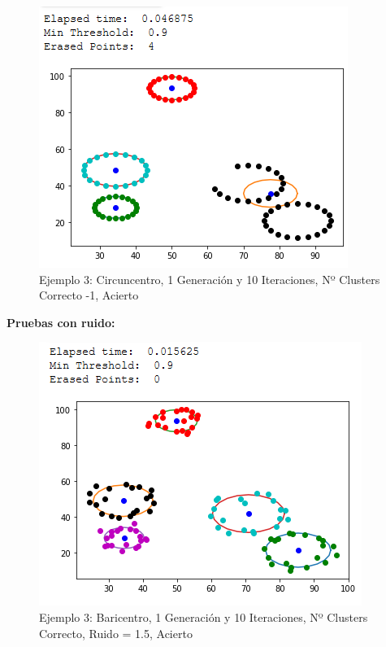 \documentclass[conference,a4paper]{IEEEtran}
\begin{document}
\begin{figure}[H]
\centering
\includegraphics[scale=0.65]{Experimentacion/Ejemplo3/ej3_c_1_10_lc}
\caption{Ejemplo 3: Circuncentro, 1 Generación y 10 Iteraciones,  Nº Clusters Correcto -1, Acierto\\}
\end{figure}

\clearpage
\textbf{Pruebas con ruido:}\\

\begin{figure}[H]
\centering
\includegraphics[scale=0.65]{Experimentacion/Ejemplo3/ej3_b_1_10_mr}
\caption{Ejemplo 3: Baricentro, 1 Generación y 10 Iteraciones,  Nº Clusters Correcto, Ruido = 1.5, Acierto\\}
\end{figure}
\end{document}
